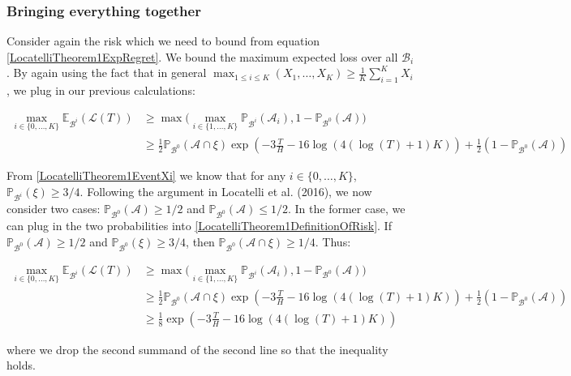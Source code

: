 \documentclass[12pt,]{article}
\begin{document}
\subsubsection{Bringing everything
together}\label{bringing-everything-together}

Consider again the risk which we need to bound from equation
\eqref{LocatelliTheorem1ExpRegret}. We bound the maximum expected loss
over all \(\mathcal{B}_i\). By again using the fact that in general
\(\max_{1 \leq i \leq K} (X_1, \dots, X_K) \geq \frac{1}{K} \sum_{i = 1}^K X_i\),
we plug in our previous calculations:

\begin{align}
\max_{i \in \{0, \dots, K\}} \mathbb{E}_{\mathcal{B}^i} (\mathcal{L}(T)) & \geq \max \big( \max_{i \in \{1, \dots, K\}} \mathbb{P}_{\mathcal{B}^i}(\mathcal{A}_i), 1 - \mathbb{P}_{\mathcal{B}^0}(\mathcal{A}) \big) \\
& \geq \frac{1}{2}\mathbb{P}_{\mathcal{B}^0} (\mathcal{A} \cap \xi) \exp (- 3 \frac{T}{H} -16 \log(4(\log(T)+1)K)) + \frac{1}{2}(1 - \mathbb{P}_{\mathcal{B}^0}(\mathcal{A})) \label{LocatelliTheorem1DefinitionOfRisk}
\end{align}

From \eqref{LocatelliTheorem1EventXi} we know that for any
\(i \in \{0, \dots, K\}\), \(\mathbb{P}_{\mathcal{B}^i}(\xi) \geq 3/4\).
Following the argument in Locatelli et al. (2016), we now consider two
cases: \(\mathbb{P}_{\mathcal{B}^0}(\mathcal{A}) \geq 1/2\) and
\(\mathbb{P}_{\mathcal{B}^0}(\mathcal{A}) \leq 1/2\). In the former
case, we can plug in the two probabilities into
\eqref{LocatelliTheorem1DefinitionOfRisk}. If
\(\mathbb{P}_{\mathcal{B}^0}(\mathcal{A}) \geq 1/2\) and
\(\mathbb{P}_{\mathcal{B}^0}(\xi) \geq 3/4\), then
\(\mathbb{P}_{\mathcal{B}^0}(\mathcal{A} \cap \xi) \geq 1/4\). Thus:

\begin{align*}
\max_{i \in \{0, \dots, K\}} \mathbb{E}_{\mathcal{B}^i} (\mathcal{L}(T)) & \geq \max \big( \max_{i \in \{1, \dots, K\}} \mathbb{P}_{\mathcal{B}^i}(\mathcal{A}_i), 1 - \mathbb{P}_{\mathcal{B}^0}(\mathcal{A}) \big) \\
& \geq \frac{1}{2}\mathbb{P}_{\mathcal{B}^0} (\mathcal{A} \cap \xi) \exp (- 3 \frac{T}{H} -16 \log(4(\log(T)+1)K)) + \frac{1}{2}(1 - \mathbb{P}_{\mathcal{B}^0}(\mathcal{A})) \\
& \geq \frac{1}{8} \exp (- 3 \frac{T}{H} -16 \log(4(\log(T)+1)K))
\end{align*}

where we drop the second summand of the second line so that the
inequality holds.
\end{document}
